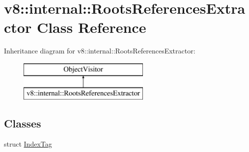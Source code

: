 \hypertarget{classv8_1_1internal_1_1_roots_references_extractor}{}\section{v8\+:\+:internal\+:\+:Roots\+References\+Extractor Class Reference}
\label{classv8_1_1internal_1_1_roots_references_extractor}
Inheritance diagram for v8\+:\+:internal\+:\+:Roots\+References\+Extractor\+:\begin{figure}[H]
\begin{center}
\leavevmode
\includegraphics[height=2.000000cm]{classv8_1_1internal_1_1_roots_references_extractor}
\end{center}
\end{figure}
\subsection*{Classes}
\begin{DoxyCompactItemize}
\item 
struct \hyperlink{structv8_1_1internal_1_1_roots_references_extractor_1_1_index_tag}{Index\+Tag}
\end{DoxyCompactItemize}
